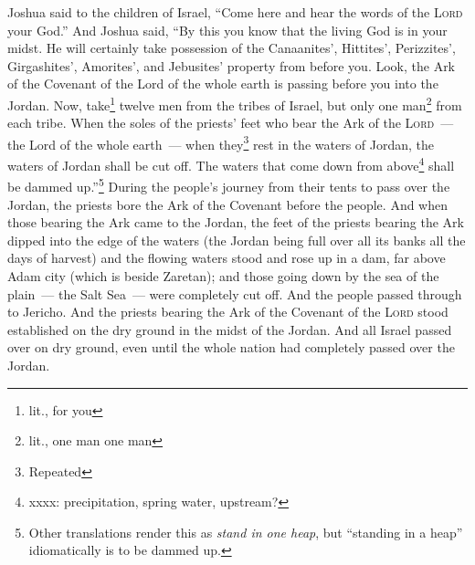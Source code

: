 \begin{inparaenum}
     Joshua said to the children of Israel, ``Come here and hear the words of the \textsc{Lord} your God.''%
     And Joshua said, ``By this you know that the living God is in your midst. He will certainly take possession of the Canaanites', Hittites', Perizzites', Girgashites', Amorites', and Jebusites' property from before you.%
     Look, the Ark of the Covenant of the Lord of the whole earth is passing before you into the Jordan.%
     Now, take\footnote{lit., for you} twelve men from the tribes of Israel, but only one man\footnote{lit., one man one man} from each tribe.%
     When the soles of the priests' feet who bear the Ark of the \textsc{Lord}~--- the Lord of the whole earth~--- when they\footnote{Repeated} rest in the waters of Jordan, the waters of Jordan shall be cut off. The waters that come down from above\footnote{xxxx: precipitation, spring water, upstream?} shall be dammed up.''\footnote{Other translations render this as \textit{stand in one heap}, but ``standing in a heap'' idiomatically is to be dammed up.}%
     During the people's journey from their tents to pass over the Jordan, the priests bore the Ark of the Covenant before the people.%
     And when those bearing the Ark came to the Jordan, the feet of the priests bearing the Ark dipped into the edge of the waters (the Jordan being full over all its banks all the days of harvest)%
     and the flowing waters stood and rose up in a dam, far above Adam city (which is beside Zaretan); and those going down by the sea of the plain~--- the Salt Sea~--- were completely cut off. And the people passed through to Jericho.%
     And the priests bearing the Ark of the Covenant of the \textsc{Lord} stood established on the dry ground in the midst of the Jordan. And all Israel passed over on dry ground, even until the whole nation had completely passed over the Jordan.%
\end{inparaenum}
